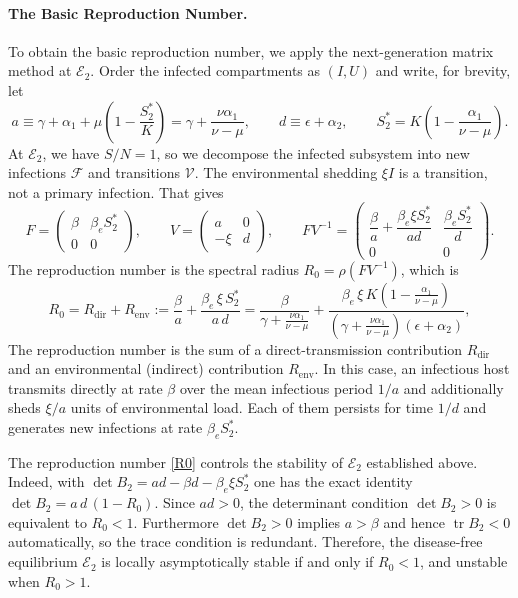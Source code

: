 \documentclass[12pt,a4paper,reqno]{amsart}
\theoremstyle{definition}
\theoremstyle{remark}
\theoremstyle{plain}
\begin{document}
\paragraph{\textbf{The Basic Reproduction Number.}}
To obtain the basic reproduction number, we apply the next-generation matrix method \cite{van2002reproduction} at $\mathcal{E}_2$. Order the infected compartments as $(I,U)$ and write, for brevity, let
$$
a\equiv\gamma+\alpha_1+\mu\left(1-\frac{S_2^{*}}{K}\right)
=\gamma+\frac{\nu\alpha_1}{\nu-\mu},
\qquad
d\equiv\epsilon+\alpha_2,
\qquad
S_2^{*}=K\left(1-\frac{\alpha_1}{\nu-\mu}\right).
$$
At $\mathcal{E}_2$, we have $S/N=1$, so we decompose the infected subsystem into new infections $\mathcal{F}$ and transitions $\mathcal{V}$. The environmental shedding $\xi I$ is a transition, not a primary infection. That gives
$$
F=\begin{pmatrix}\beta & \beta_e S_2^{*}\\[2pt]0 & 0\end{pmatrix},
\qquad
V=\begin{pmatrix}a & 0\\[2pt]-\xi & d\end{pmatrix},
\qquad
FV^{-1}=\begin{pmatrix}\dfrac{\beta}{a}+\dfrac{\beta_e\xi S_2^{*}}{ad} & \dfrac{\beta_e S_2^{*}}{d}\\[8pt]0 & 0\end{pmatrix}.
$$
The reproduction number is the spectral radius $R_0=\rho(FV^{-1})$, which is
\begin{equation}\label{R0}
R_0=R_{\mathrm{dir}}+R_{\mathrm{env}}:=\frac{\beta}{a}+\frac{\beta_e\,\xi\,S_2^{*}}{a\,d}
=\frac{\beta}{\gamma+\frac{\nu\alpha_1}{\nu-\mu}}
+\frac{\beta_e\,\xi\,K\left(1-\frac{\alpha_1}{\nu-\mu}\right)}
{\left(\gamma+\frac{\nu\alpha_1}{\nu-\mu}\right)(\epsilon+\alpha_2)},
\end{equation}
The reproduction number is the sum of a direct-transmission contribution $R_{\mathrm{dir}}$ and an environmental (indirect) contribution $R_{\mathrm{env}}$. In this case, an infectious host transmits directly at rate $\beta$ over the mean infectious period $1/a$ and additionally sheds $\xi/a$ units of environmental load. Each of them persists for time $1/d$ and generates new infections at rate $\beta_e S_2^{*}$.

The reproduction number \eqref{R0} controls the stability of $\mathcal{E}_2$ established above. Indeed, with $\det B_2=ad-\beta d-\beta_e\xi S_2^{*}$ one has the exact identity $\det B_2 = a\,d\,(1-R_0)$. Since $ad>0$, the determinant condition $\det B_2>0$ is equivalent to $R_0<1$. Furthermore $\det B_2>0$ implies $a>\beta$ and hence $\operatorname{tr}B_2<0$ automatically, so the trace condition is redundant. Therefore, the disease-free equilibrium $\mathcal{E}_2$ is locally asymptotically stable if and only if $R_0<1$, and unstable when $R_0>1$.
\end{document}
